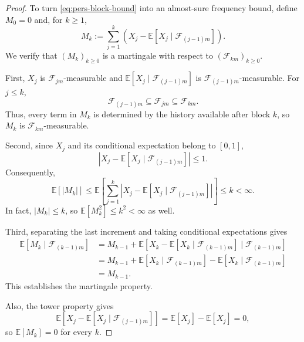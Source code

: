 \documentclass[11pt]{article}
\begin{document}
\begin{proof}
To turn \eqref{eq:pers-block-bound} into an almost-sure frequency
bound, define $M_0=0$ and, for $k\ge1$,
\begin{equation*}
M_k
:=\sum_{j=1}^{k}
\left(
X_j-\mathbb E[X_j\mid\mathcal F_{(j-1)m}]
\right).
\end{equation*}
We verify that $(M_k)_{k\ge0}$ is a martingale with respect to
$(\mathcal F_{km})_{k\ge0}$.

First, $X_j$ is $\mathcal F_{jm}$-measurable and
$\mathbb E[X_j\mid\mathcal F_{(j-1)m}]$ is
$\mathcal F_{(j-1)m}$-measurable.
For $j\le k$,
\begin{equation*}
\mathcal F_{(j-1)m}
\subseteq\mathcal F_{jm}
\subseteq\mathcal F_{km}.
\end{equation*}
Thus, every term in $M_k$ is determined by the history available
after block $k$, so $M_k$ is $\mathcal F_{km}$-measurable.

Second, since $X_j$ and its conditional expectation belong
to $[0,1]$,
\begin{equation*}
\left|
X_j-\mathbb E[X_j\mid\mathcal F_{(j-1)m}]
\right|\le1.
\end{equation*}
Consequently,
\begin{equation*}
\mathbb E[|M_k|]
\le
\mathbb E\!\left[
\sum_{j=1}^{k}
\left|
X_j-\mathbb E[X_j\mid\mathcal F_{(j-1)m}]
\right|
\right]
\le k<\infty.
\end{equation*}
In fact, $|M_k|\le k$, so
$\mathbb E[M_k^2]\le k^2<\infty$ as well.

Third, separating the last increment and taking conditional
expectations gives
\begin{equation*}
\begin{aligned}
\mathbb E[M_k\mid\mathcal F_{(k-1)m}]
&=M_{k-1}
+\mathbb E\!\left[
X_k-\mathbb E[X_k\mid\mathcal F_{(k-1)m}]
\mid\mathcal F_{(k-1)m}
\right]\\
&=M_{k-1}
+\mathbb E[X_k\mid\mathcal F_{(k-1)m}]
-\mathbb E[X_k\mid\mathcal F_{(k-1)m}]\\
&=M_{k-1}.
\end{aligned}
\end{equation*}
This establishes the martingale property.

Also, the tower property gives
\begin{equation*}
\mathbb E\!\left[
X_j-\mathbb E[X_j\mid\mathcal F_{(j-1)m}]
\right]
=\mathbb E[X_j]-\mathbb E[X_j]=0,
\end{equation*}
so $\mathbb E[M_k]=0$ for every $k$.


\end{proof}
\end{document}
